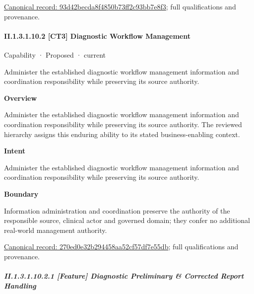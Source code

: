 {\footnotesize \href{../../../../continuum/strategy/capability/feature/93d42becda8f4850b73ff2c93bb7e8f3.md}{Canonical record: 93d42becda8f4850b73ff2c93bb7e8f3}; full qualifications and provenance.}\par
\paragraph*{II.1.3.1.10.2 [CT3] Diagnostic Workflow Management}
\label{navigation:II.1.3.1.10.2}

\label{element:270ed0e32b294458aa52cf57df7e55db}
{\small Capability · Proposed · current}\par

Administer the established diagnostic workflow management information and coordination responsibility while preserving its source authority.



\textbf{Overview}



Administer the established diagnostic workflow management information and coordination responsibility while preserving its source authority. The reviewed hierarchy assigns this enduring ability to its stated business-enabling context.



\textbf{Intent}



Administer the established diagnostic workflow management information and coordination responsibility while preserving its source authority.



\textbf{Boundary}



Information administration and coordination preserve the authority of the responsible source, clinical actor and governed domain; they confer no additional real-world management authority.


{\footnotesize \href{../../../../continuum/strategy/capability/270ed0e32b294458aa52cf57df7e55db.md}{Canonical record: 270ed0e32b294458aa52cf57df7e55db}; full qualifications and provenance.}\par
\subparagraph*{II.1.3.1.10.2.1 [Feature] Diagnostic Preliminary \& Corrected Report Handling}
\label{navigation:II.1.3.1.10.2.1}

